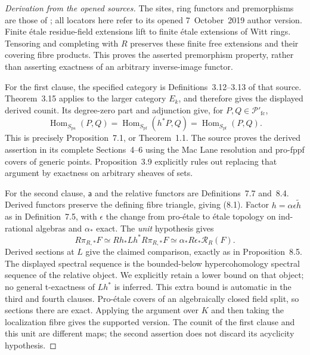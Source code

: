 \begin{proof}[Derivation from the opened sources]
The sites, ring functors and premorphisms are those of
\cite[Definitions~3.2, 3.4, 3.7--3.8, 7.4--7.7, 8.1--8.4;
Proposition~8.3]{BSuzuki2021}; all locators here refer to its opened
7~October~2019 author version. Finite étale residue-field extensions
lift to finite étale extensions of Witt rings. Tensoring and completing
with $R$ preserves these finite free extensions and their covering
fibre products. This proves the asserted premorphism property, rather
than asserting exactness of an arbitrary inverse-image functor.

For the first clause, the specified category is Definitions~3.12--3.13
of that source. Theorem~3.15 applies to the larger category $E_k$, and
therefore gives the displayed derived counit. Its degree-zero part
and adjunction give, for $P,Q\in\mathcal P'_{\mathrm{fc}}$,
\[
 \operatorname{Hom}_{S_{\mathrm{pa}}}(P,Q)
 =\operatorname{Hom}_{S_{\mathrm{pf}}}(h^*P,Q)
 =\operatorname{Hom}_{S_{\mathrm{pf}}}(P,Q).
\]
This is precisely Proposition~7.1, or Theorem~1.1.
The source proves the derived assertion in its complete
Sections~4--6 using the Mac Lane resolution and pro-fppf covers of
generic points. Proposition~3.9 explicitly rules out replacing that
argument by exactness on arbitrary sheaves of sets.

For the second clause, $\mathsf a$ and the relative functors are
Definitions~7.7 and~8.4. Derived functors preserve the defining fibre
triangle, giving (8.1). Factor
$h=\alpha\epsilon\widetilde h$ as in Definition~7.5, with
$\epsilon$ the change from pro-étale to étale topology on ind-rational
algebras and $\alpha_*$ exact. The \emph{unit} hypothesis gives
\[
 R\pi_{R,*}F
 \simeq Rh_*Lh^*R\pi_{R,*}F
 \simeq\alpha_*R\epsilon_*\mathcal R_R(F).
\]
Derived sections at $L$ give the claimed comparison, exactly as in
Proposition~8.5. The displayed spectral sequence is the bounded-below hypercohomology
spectral sequence of the relative object. We explicitly retain a lower
bound on that object; no general t-exactness of $Lh^*$ is inferred.
This extra bound is automatic in the third and fourth clauses. Pro-étale covers of an algebraically
closed field split, so sections there are exact. Applying the argument
over $K$ and then taking the localization fibre gives the supported
version. The counit of the first clause and this unit are different
maps; the second assertion does not discard its acyclicity hypothesis.


\end{proof}
